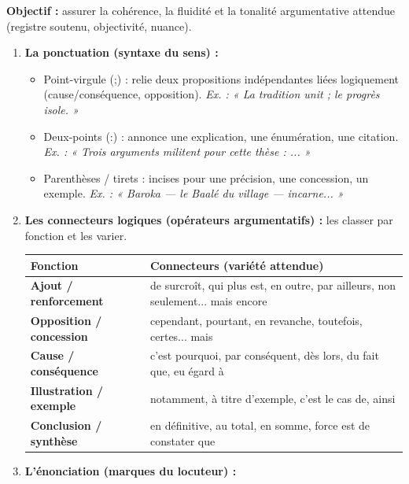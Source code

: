 \documentclass[11pt]{article}
\newcommand{\cle}[1]{{\popxbold\color{popdark}#1}}
\begin{document}
\begin{methode}
    \textbf{Objectif :} assurer la cohérence, la fluidité et la tonalité argumentative attendue (registre soutenu, objectivité, nuance).
    \begin{enumerate}
        \item \textbf{La ponctuation (syntaxe du sens) :}
            \begin{itemize}
                \item \cle{Point-virgule (;)} : relie deux propositions indépendantes liées logiquement (cause/conséquence, opposition). \emph{Ex. : « La tradition unit ; le progrès isole. »}
                \item \cle{Deux-points (:)} : annonce une explication, une énumération, une citation. \emph{Ex. : « Trois arguments militent pour cette thèse : ... »}
                \item \cle{Parenthèses / tirets} : incises pour une précision, une concession, un exemple. \emph{Ex. : « Baroka — le Baalé du village — incarne... »}
            \end{itemize}
        \item \textbf{Les connecteurs logiques (opérateurs argumentatifs) :} les classer par fonction et les varier.
            \begin{center}
            \begin{tabular}{|l|l|}\hline
            \rowcolor{popblueL}\textbf{Fonction} & \textbf{Connecteurs (variété attendue)} \\ \hline
            \textbf{Ajout / renforcement} & de surcroît, qui plus est, en outre, par ailleurs, non seulement... mais encore \\ \hline
            \textbf{Opposition / concession} & cependant, pourtant, en revanche, toutefois, certes... mais \\ \hline
            \textbf{Cause / conséquence} & c'est pourquoi, par conséquent, dès lors, du fait que, eu égard à \\ \hline
            \textbf{Illustration / exemple} & notamment, à titre d'exemple, c'est le cas de, ainsi \\ \hline
            \textbf{Conclusion / synthèse} & en définitive, au total, en somme, force est de constater que \\ \hline
            \end{tabular}
            \end{center}
        \item \textbf{L'énonciation (marques du locuteur) :}

\end{enumerate}
\end{methode}
\end{document}

